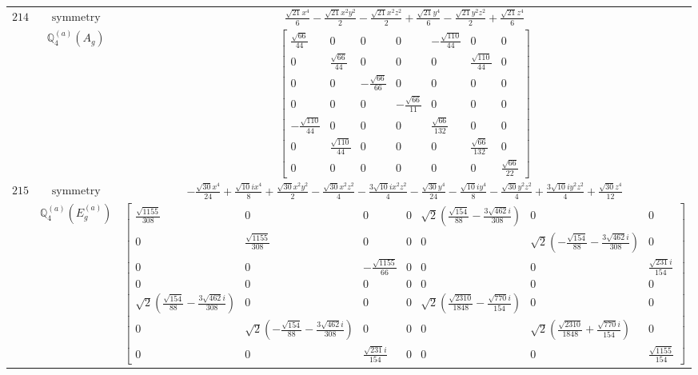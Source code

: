 \documentclass[fleqn,8pt,landscape]{jsarticle}
\begin{document}
\begin{longtable}{ccc}
$ 214 $ & $ \text{symmetry} $ & $ \frac{\sqrt{21} x^{4}}{6} - \frac{\sqrt{21} x^{2} y^{2}}{2} - \frac{\sqrt{21} x^{2} z^{2}}{2} + \frac{\sqrt{21} y^{4}}{6} - \frac{\sqrt{21} y^{2} z^{2}}{2} + \frac{\sqrt{21} z^{4}}{6} $ \\
$  $ & $ \mathbb{Q}_{4}^{(a)}(A_{g}) $ & $ \begin{bmatrix} \frac{\sqrt{66}}{44} & 0 & 0 & 0 & - \frac{\sqrt{110}}{44} & 0 & 0 \\ 0 & \frac{\sqrt{66}}{44} & 0 & 0 & 0 & \frac{\sqrt{110}}{44} & 0 \\ 0 & 0 & - \frac{\sqrt{66}}{66} & 0 & 0 & 0 & 0 \\ 0 & 0 & 0 & - \frac{\sqrt{66}}{11} & 0 & 0 & 0 \\ - \frac{\sqrt{110}}{44} & 0 & 0 & 0 & \frac{\sqrt{66}}{132} & 0 & 0 \\ 0 & \frac{\sqrt{110}}{44} & 0 & 0 & 0 & \frac{\sqrt{66}}{132} & 0 \\ 0 & 0 & 0 & 0 & 0 & 0 & \frac{\sqrt{66}}{22} \end{bmatrix} $ \\ \hline
$ 215 $ & $ \text{symmetry} $ & $ - \frac{\sqrt{30} x^{4}}{24} + \frac{\sqrt{10} i x^{4}}{8} + \frac{\sqrt{30} x^{2} y^{2}}{2} - \frac{\sqrt{30} x^{2} z^{2}}{4} - \frac{3 \sqrt{10} i x^{2} z^{2}}{4} - \frac{\sqrt{30} y^{4}}{24} - \frac{\sqrt{10} i y^{4}}{8} - \frac{\sqrt{30} y^{2} z^{2}}{4} + \frac{3 \sqrt{10} i y^{2} z^{2}}{4} + \frac{\sqrt{30} z^{4}}{12} $ \\
$  $ & $ \mathbb{Q}_{4}^{(a)}(E_{g}^{(a)}) $ & $ \begin{bmatrix} \frac{\sqrt{1155}}{308} & 0 & 0 & 0 & \sqrt{2} \left(\frac{\sqrt{154}}{88} - \frac{3 \sqrt{462} i}{308}\right) & 0 & 0 \\ 0 & \frac{\sqrt{1155}}{308} & 0 & 0 & 0 & \sqrt{2} \left(- \frac{\sqrt{154}}{88} - \frac{3 \sqrt{462} i}{308}\right) & 0 \\ 0 & 0 & - \frac{\sqrt{1155}}{66} & 0 & 0 & 0 & \frac{\sqrt{231} i}{154} \\ 0 & 0 & 0 & 0 & 0 & 0 & 0 \\ \sqrt{2} \left(\frac{\sqrt{154}}{88} - \frac{3 \sqrt{462} i}{308}\right) & 0 & 0 & 0 & \sqrt{2} \left(\frac{\sqrt{2310}}{1848} - \frac{\sqrt{770} i}{154}\right) & 0 & 0 \\ 0 & \sqrt{2} \left(- \frac{\sqrt{154}}{88} - \frac{3 \sqrt{462} i}{308}\right) & 0 & 0 & 0 & \sqrt{2} \left(\frac{\sqrt{2310}}{1848} + \frac{\sqrt{770} i}{154}\right) & 0 \\ 0 & 0 & \frac{\sqrt{231} i}{154} & 0 & 0 & 0 & \frac{\sqrt{1155}}{154} \end{bmatrix} $ \\ \hline

\end{longtable}
\end{document}
